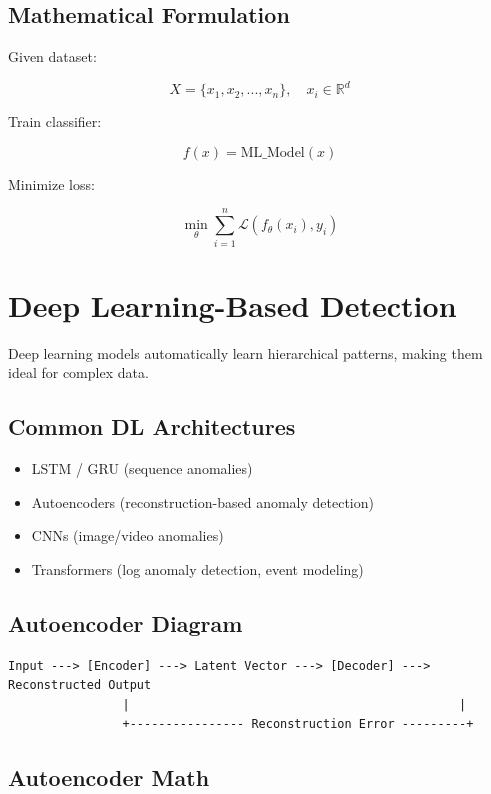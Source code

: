 \documentclass[12pt, draftclsnofoot, onecolumn]{IEEEtran}
\begin{document}
\subsection{Mathematical Formulation}
Given dataset:


\[
X = \{x_1, x_2, ..., x_n\}, \quad x_i \in \mathbb{R}^d
\]



Train classifier:


\[
f(x) = \text{ML\_Model}(x)
\]



Minimize loss:


\[
\min_{\theta} \sum_{i=1}^{n} \mathcal{L}(f_{\theta}(x_i), y_i)
\]



\section{Deep Learning-Based Detection}
Deep learning models automatically learn hierarchical patterns, making them ideal for complex data.

\subsection{Common DL Architectures}
\begin{itemize}
\item LSTM / GRU (sequence anomalies)
\item Autoencoders (reconstruction-based anomaly detection)
\item CNNs (image/video anomalies)
\item Transformers (log anomaly detection, event modeling)
\end{itemize}

\subsection{Autoencoder Diagram}
\begin{verbatim}
Input ---> [Encoder] ---> Latent Vector ---> [Decoder] ---> Reconstructed Output
                |                                              |
                +---------------- Reconstruction Error ---------+
\end{verbatim}

\subsection{Autoencoder Math}
\end{document}
